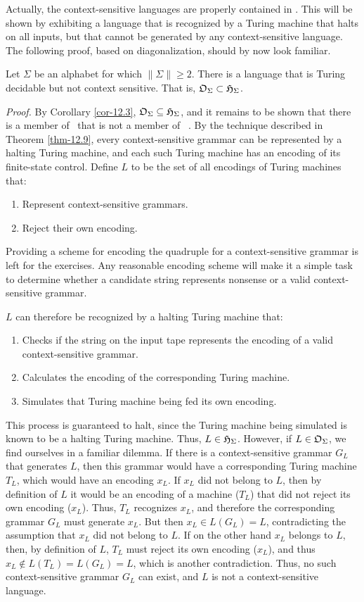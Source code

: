 Actually, the context-sensitive languages are properly contained in \HSIG. This
will be shown by exhibiting a language that is recognized by a Turing machine
that halts on all inputs, but that cannot be generated by any context-sensitive
language. The following proof, based on diagonalization, should by now look
familiar.

\begin{thm}\label{thm-12.15}
Let $\Sigma$ be an alphabet for which $\|\Sigma\|\geq 2$. There is a language
that is Turing decidable but not context sensitive. That is, $\mathfrak{O}_\Sigma\subset\mathfrak{H}_\Sigma$.

\emph{Proof.} By Corollary \ref{cor-12.3}, $\mathfrak{O}_\Sigma\subseteq\mathfrak{H}_\Sigma$, and it remains
to be shown that there is a member of  \HSIG\ that is not a member of \ \OSIG. By
the technique described in Theorem \ref{thm-12.9}, every context-sensitive
grammar can be represented by a halting Turing machine, and each such Turing
machine has an encoding of its finite-state control. Define $L$ to be the set of
all encodings of Turing machines that:
\begin{enumerate}
\item Represent context-sensitive grammars.
\item Reject their own encoding.
\end{enumerate}
Providing a scheme for encoding the quadruple for a context-sensitive grammar
is left for the exercises. Any reasonable encoding scheme will make it a simple
task to determine whether a candidate string represents nonsense or a valid
context-sensitive grammar.

$L$ can therefore be recognized by a halting Turing machine that:
\begin{enumerate}
\item Checks if the string on the input tape represents the encoding of a valid
context-sensitive grammar.
\item Calculates the encoding of the corresponding Turing machine.
\item Simulates that Turing machine being fed its own encoding.
\end{enumerate}
This process is guaranteed to halt, since the Turing machine being simulated is
known to be a halting Turing machine. Thus, $L\in\mathfrak{H}_\Sigma$. However, if $L\in\mathfrak{O}_\Sigma$,
we find ourselves in a familiar dilemma. If there is a context-sensitive grammar
$G_L$ that generates $L$, then this grammar would have a corresponding Turing
machine $T_L$, which would have an encoding $x_L$. If $x_L$ did not belong to
$L$, then by definition of $L$ it would be an encoding of a machine ($T_L$) that
did not reject its own encoding ($x_L$). Thus, $T_L$ recognizes $x_L$, and
therefore the corresponding grammar $G_L$ must generate $x_L$. But then $x_L\in
L(G_L)=L$, contradicting the assumption that $x_L$ did not belong to $L$. If on
the other hand $x_L$ belongs to $L$, then, by definition of $L$, $T_L$ must
reject its own encoding ($x_L$), and thus $x_L\not \in L(T_L)=L(G_L)=L$, which is
another contradiction. Thus, no such context-sensitive grammar $G_L$ can exist,
and $L$ is not a context-sensitive language.
\end{thm}

